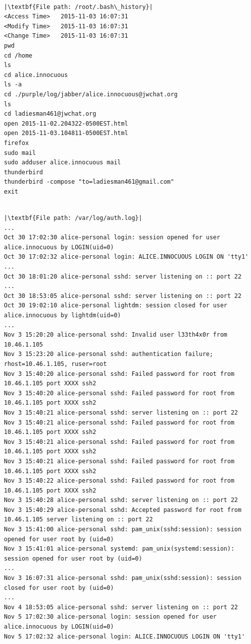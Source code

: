 \documentclass[addpoints]{exam}
\begin{document}
\begin{questions}
\begin{lstlisting}
\end{lstlisting}

\pagebreak

\begin{lstlisting}

|\textbf{File path: /root/.bash\_history}|
<Access Time>   2015-11-03 16:07:31
<Modify Time>   2015-11-03 16:07:31
<Change Time>   2015-11-03 16:07:31
pwd
cd /home
ls
cd alice.innocuous
ls -a
cd ./purple/log/jabber/alice.innocuous@jwchat.org
ls
cd ladiesman461@jwchat.org
open 2015-11-02.204322-0500EST.html
open 2015-11-03.104811-0500EST.html
firefox
sudo mail
sudo adduser alice.innocuous mail
thunderbird
thunderbird -compose "to=ladiesman461@gmail.com"
exit

\end{lstlisting}

\pagebreak

\begin{lstlisting}

|\textbf{File path: /var/log/auth.log}|
...
Oct 30 17:02:30 alice-personal login: session opened for user alice.innocuous by LOGIN(uid=0)
Oct 30 17:02:32 alice-personal login: ALICE.INNOCUOUS LOGIN ON 'tty1'
...
Oct 30 18:01:20 alice-personal sshd: server listening on :: port 22
...
Oct 30 18:53:05 alice-personal sshd: server listening on :: port 22
Oct 30 19:02:10 alice-personal lightdm: session closed for user alice.innocuous by lightdm(uid=0)
...
Nov 3 15:20:20 alice-personal sshd: Invalid user l33th4x0r from 10.46.1.105
Nov 3 15:23:20 alice-personal sshd: authentication failure; rhost=10.46.1.105, ruser=root
Nov 3 15:40:20 alice-personal sshd: Failed password for root from 10.46.1.105 port XXXX ssh2
Nov 3 15:40:20 alice-personal sshd: Failed password for root from 10.46.1.105 port XXXX ssh2
Nov 3 15:40:21 alice-personal sshd: server listening on :: port 22
Nov 3 15:40:21 alice-personal sshd: Failed password for root from 10.46.1.105 port XXXX ssh2
Nov 3 15:40:21 alice-personal sshd: Failed password for root from 10.46.1.105 port XXXX ssh2
Nov 3 15:40:21 alice-personal sshd: Failed password for root from 10.46.1.105 port XXXX ssh2
Nov 3 15:40:22 alice-personal sshd: Failed password for root from 10.46.1.105 port XXXX ssh2
Nov 3 15:40:28 alice-personal sshd: server listening on :: port 22
Nov 3 15:40:29 alice-personal sshd: Accepted password for root from 10.46.1.105 server listening on :: port 22
Nov 3 15:41:00 alice-personal sshd: pam_unix(sshd:session): session opened for user root by (uid=0)
Nov 3 15:41:01 alice-personal systemd: pam_unix(systemd:session): session opened for user root by (uid=0)
...
Nov 3 16:07:31 alice-personal sshd: pam_unix(sshd:session): session closed for user root by (uid=0)
...
Nov 4 18:53:05 alice-personal sshd: server listening on :: port 22
Nov 5 17:02:30 alice-personal login: session opened for user alice.innocuous by LOGIN(uid=0)
Nov 5 17:02:32 alice-personal login: ALICE.INNOCUOUS LOGIN ON 'tty1'


\end{lstlisting}
\end{questions}
\end{document}
